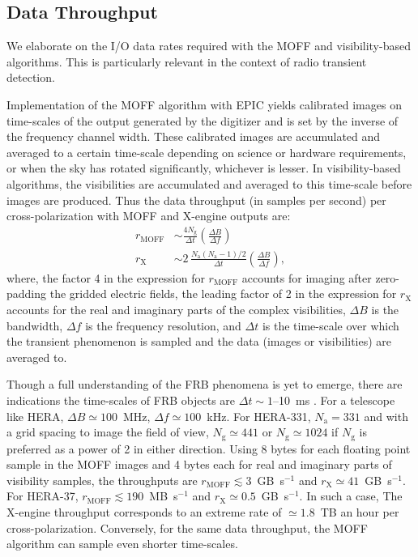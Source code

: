 \documentclass[a4paper,fleqn,usenatbib]{mnras}
\newcommand{\Nant}{N_\textrm{a}}
\newcommand{\Ngrid}{N_\textrm{g}}
\begin{document}
\subsection{Data Throughput}

We elaborate on the I/O data rates required with the MOFF and visibility-based
algorithms. This is particularly relevant in the context of radio transient 
detection. 

Implementation of the MOFF algorithm with EPIC yields calibrated images on
time-scales of the output generated by the digitizer and is set by the inverse
of the frequency channel width. These calibrated images are accumulated and 
averaged to a certain time-scale depending on science or hardware requirements,
or when the sky has rotated significantly, whichever is lesser. In 
visibility-based algorithms, the visibilities are accumulated and averaged to 
this time-scale before images are produced. Thus the data throughput (in samples 
per second) per cross-polarization with MOFF and X-engine outputs are: 
\begin{align}
  r_\textrm{MOFF} &\sim \frac{4\Ngrid}{\Delta t} \left(\frac{\Delta B}{\Delta f}\right) \\
  r_\textrm{X} &\sim 2\,\frac{\Nant(\Nant-1)/2}{\Delta t} \left(\frac{\Delta B}{\Delta f}\right),
\end{align}
where, the factor 4 in the expression for $r_\textrm{MOFF}$ accounts for imaging
after zero-padding the gridded electric fields, the leading factor of 2 in the
expression for $r_\textrm{X}$ accounts for the real and imaginary parts of the
complex visibilities, $\Delta B$ is the bandwidth, $\Delta f$ is the frequency 
resolution, and $\Delta t$ is the time-scale over which the transient phenomenon
is sampled and the data (images or visibilities) are averaged to.

Though a full understanding of the FRB phenomena is yet to emerge, there are 
indications the time-scales of FRB objects are $\Delta t \sim 1$--10~ms 
\citep{tho13}. For a telescope like HERA, $\Delta B \simeq 100$~MHz, 
$\Delta f \simeq 100$~kHz. For HERA-331, $\Nant=331$ and with a grid 
spacing to image the field of view, $\Ngrid \simeq 441$ or 
$\Ngrid \simeq 1024$ if $\Ngrid$ is preferred as a power of 2 in either 
direction. Using 8 bytes for each floating point sample in the MOFF images and 
4 bytes each for real and imaginary parts of visibility samples, the throughputs 
are $r_\textrm{MOFF} \lesssim 3$~GB~s$^{-1}$ and 
$r_\textrm{X} \simeq 41$~GB~s$^{-1}$. For HERA-37, 
$r_\textrm{MOFF} \lesssim 190$~MB~s$^{-1}$ and 
$r_\textrm{X} \simeq 0.5$~GB~s$^{-1}$. In such a case, The X-engine throughput 
corresponds to an extreme rate of $\simeq 1.8$~TB an hour per 
cross-polarization. Conversely, for the same data throughput, the MOFF algorithm 
can sample even shorter time-scales. 
\end{document}

